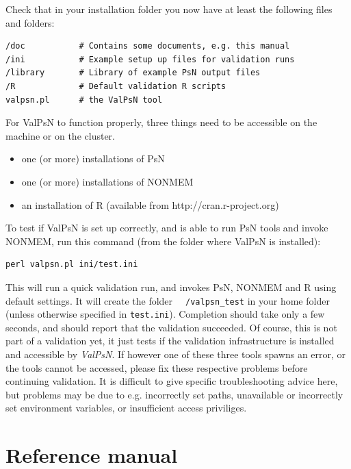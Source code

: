 \documentclass[a4,11pt]{report} \usepackage[pdftex]{graphicx}
\newcommand{\ValPsN}{\textcolor{PiranaOrange}{\textit{ValPsN}}\xspace}
\begin{document}
\vspace{10pt}
\noindent Check that in your installation folder you now have at
least the following files and folders:

\begin{lstlisting}
/doc           # Contains some documents, e.g. this manual
/ini           # Example setup up files for validation runs
/library       # Library of example PsN output files
/R             # Default validation R scripts
valpsn.pl      # the ValPsN tool
\end{lstlisting}

\noindent For ValPsN to function properly, three things need to be accessible on
the machine or on the cluster.
\begin{itemize}
\item one (or more) installations of PsN
\item one (or more) installations of NONMEM
\item an installation of R (available from http://cran.r-project.org)
\end{itemize}

\noindent To test if ValPsN is set up correctly, and is able to run PsN tools
and invoke NONMEM, run this command (from the folder where ValPsN is
installed):

\vspace{5pt}
\begin{lstlisting}
perl valpsn.pl ini/test.ini
\end{lstlisting}
\vspace{5pt}

\noindent This will run a quick validation run, and invokes PsN,
NONMEM and R using default settings. It will create the folder {\tt
  ~/valpsn\_test} in your home folder (unless otherwise specified in
{\tt test.ini}). Completion should take only a few seconds, and should
report that the validation succeeded. Of course, this is not part of a
validation yet, it just tests if the validation infrastructure is
installed and accessible by \ValPsN. If however one of these three
tools spawns an error, or the tools cannot be accessed, please fix
these respective problems before continuing validation. It is
difficult to give specific troubleshooting advice here, but problems
may be due to e.g. incorrectly set paths, unavailable or incorrectly
set environment variables, or insufficient access priviliges.

\chapter{Reference manual}
\end{document}
